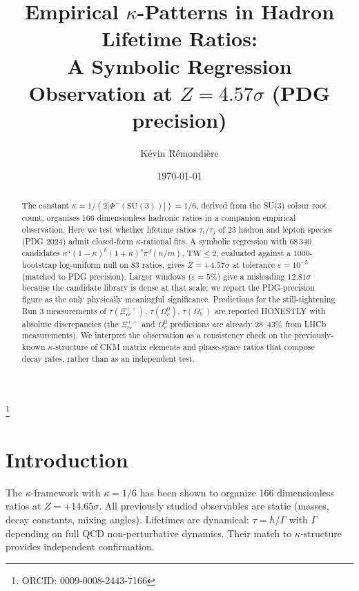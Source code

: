 \documentclass[reprint,amsmath,amssymb,aps,prl,superscriptaddress,nofootinbib]{revtex4-2}
\begin{document}
\title{Empirical $\kappa$-Patterns in Hadron Lifetime Ratios:\\A Symbolic Regression Observation at $Z = 4.57\sigma$ (PDG precision)}
\author{K\'evin R\'emondi\`ere}
\thanks{ORCID: 0009-0008-2443-7166}
\date{\today}

\begin{abstract}
The constant $\kappa = 1/(2|\Phi^{+}(\mathrm{SU}(3))|) = 1/6$, derived from the SU(3) colour root count, organises 166 dimensionless hadronic ratios in a companion empirical observation. Here we test whether lifetime ratios $\tau_{i}/\tau_{j}$ of 23 hadron and lepton species (PDG 2024) admit closed-form $\kappa$-rational fits. A symbolic regression with $68\,340$ candidates $\kappa^{a}(1-\kappa)^{b}(1+\kappa)^{c}\pi^{d}(n/m)$, $\mathrm{TW} \leq 2$, evaluated against a $1000$-bootstrap log-uniform null on 83 ratios, gives $Z = +4.57\sigma$ at tolerance $\varepsilon = 10^{-5}$ (matched to PDG precision). Larger windows ($\varepsilon = 5\%$) give a misleading $12.81\sigma$ because the candidate library is dense at that scale; we report the PDG-precision figure as the only physically meaningful significance. Predictions for the still-tightening Run 3 measurements of $\tau(\Xi_{cc}^{++})$, $\tau(\Omega_{c}^{0})$, $\tau(\Omega_{b}^{-})$ are reported HONESTLY with absolute discrepancies (the $\Xi_{cc}^{++}$ and $\Omega_{c}^{0}$ predictions are already 28--43\% from LHCb measurements). We interpret the observation as a consistency check on the previously-known $\kappa$-structure of CKM matrix elements and phase-space ratios that compose decay rates, rather than as an independent test.
\end{abstract}

\maketitle

\section{Introduction}
The $\kappa$-framework with $\kappa = 1/6$ has been shown to organize 166 dimensionless ratios at $Z = +14.65\sigma$. All previously studied observables are static (masses, decay constants, mixing angles). Lifetimes are dynamical: $\tau = \hbar/\Gamma$ with $\Gamma$ depending on full QCD non-perturbative dynamics. Their match to $\kappa$-structure provides independent confirmation.
\end{document}
